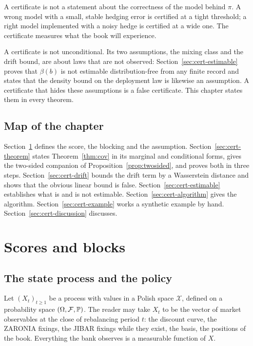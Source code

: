 \documentclass[../../../main.tex]{subfiles}
\begin{document}
A certificate is not a statement about the correctness of the model behind $\pi$. A wrong model with a small, stable hedging error is certified at a tight threshold; a right model implemented with a noisy hedge is certified at a wide one. The certificate measures what the book will experience.

A certificate is not unconditional. Its two assumptions, the mixing class and the drift bound, are about laws that are not observed: Section~\ref{sec:cert-estimable} proves that $\beta(b)$ is not estimable distribution-free from any finite record and states that the density bound on the deployment law is likewise an assumption. A certificate that hides these assumptions is a false certificate. This chapter states them in every theorem.

\subsection{Map of the chapter}

Section~\ref{sec:cert-scores} defines the score, the blocking and the assumption. Section~\ref{sec:cert-theorem} states Theorem~\ref{thm:cov} in its marginal and conditional forms, gives the two-sided companion of Proposition~\ref{prop:twosided}, and proves both in three steps. Section~\ref{sec:cert-drift} bounds the drift term by a Wasserstein distance and shows that the obvious linear bound is false. Section~\ref{sec:cert-estimable} establishes what is and is not estimable. Section~\ref{sec:cert-algorithm} gives the algorithm. Section~\ref{sec:cert-example} works a synthetic example by hand. Section~\ref{sec:cert-discussion} discusses.

\section{Scores and blocks}\label{sec:cert-scores}

\subsection{The state process and the policy}\label{sec:cert-policy}

Let $(X_t)_{t\ge1}$ be a process with values in a Polish space $\mathcal X$, defined on a probability space $(\Omega,\mathcal F,\mathbb{P})$. The reader may take $X_t$ to be the vector of market observables at the close of rebalancing period $t$: the discount curve, the ZARONIA fixings, the JIBAR fixings while they exist, the basis, the positions of the book. Everything the bank observes is a measurable function of $X$.
\end{document}
